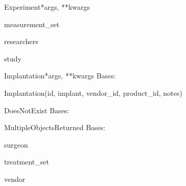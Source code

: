 \documentclass[letterpaper,10pt,english]{sphinxmanual}
\begin{document}
\begin{classdesc}{Experiment}{*args, **kwargs}
\hypertarget{data.models.Experiment.measurement_set}{}\begin{memberdesc}[Experiment]{measurement\_set}\end{memberdesc}

\hypertarget{data.models.Experiment.researchers}{}\begin{memberdesc}[Experiment]{researchers}\end{memberdesc}

\hypertarget{data.models.Experiment.study}{}\begin{memberdesc}[Experiment]{study}\end{memberdesc}
\end{classdesc}

\hypertarget{data.models.Implantation}{}\begin{classdesc}{Implantation}{*args, **kwargs}
Bases: 

Implantation(id, implant, vendor\_id, product\_id, notes)

\hypertarget{data.models.Implantation.DoesNotExist}{}\begin{excdesc}{DoesNotExist}
Bases: 
\end{excdesc}

\hypertarget{data.models.Implantation.MultipleObjectsReturned}{}\begin{excdesc}{MultipleObjectsReturned}
Bases: 
\end{excdesc}

\hypertarget{data.models.Implantation.surgeon}{}\begin{memberdesc}[Implantation]{surgeon}\end{memberdesc}

\hypertarget{data.models.Implantation.treatment_set}{}\begin{memberdesc}[Implantation]{treatment\_set}\end{memberdesc}

\hypertarget{data.models.Implantation.vendor}{}\begin{memberdesc}[Implantation]{vendor}\end{memberdesc}
\end{classdesc}
\end{document}
